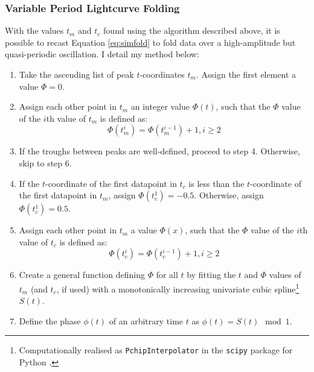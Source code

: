 \subsubsection{Variable Period Lightcurve Folding}

\label{sec:vfold}

\par With the values $t_m$ and $t_c$ found using the algorithm described above, it is possible to recast Equation \ref{eq:simfold} to fold data over a high-amplitude but quasi-periodic oscillation.  I detail my method below:

\begin{enumerate}
  \item Take the ascending list of peak $t$-coordinates $t_m$.  Assign the first element a value $\Phi=0$.
  \item Assign each other point in $t_m$ an integer value $\Phi(t)$, such that the $\Phi$ value of the $i$th value of $t_m$ is defined as:
  \begin{equation}
  \Phi(t_m^{i})=\Phi(t_m^{i-1})+1, i\geq2
  \end{equation}
  \item If the troughs between peaks are well-defined, proceed to step 4.  Otherwise, skip to step 6.
  \item If the $t$-coordinate of the first datapoint in $t_c$ is less than the $t$-coordinate of the first datapoint in $t_m$, assign $\Phi(t_c^1)=-0.5$.  Otherwise, assign $\Phi(t_c^1)=0.5$.
  \item Assign each other point in $t_m$ a value $\Phi(x)$, such that the $\Phi$ value of the $i$th value of $t_c$ is defined as:
  \begin{equation}
  \Phi(t_c^{i})=\Phi(t_c^{i-1})+1, i\geq2
  \end{equation}
  \item Create a general function defining $\Phi$ for all $t$ by fitting the $t$ and $\Phi$ values of $t_m$ (and $t_c$, if used) with a monotonically increasing univariate cubic spline\footnote{Computationally realised as \texttt{PchipInterpolator} in the \texttt{scipy} package for Python \citep{NumPy}.} $S(t)$.
  \item Define the phase $\phi(t)$ of an arbitrary time $t$ as $\phi(t)=S(t)\mod1$.
\end{enumerate}

